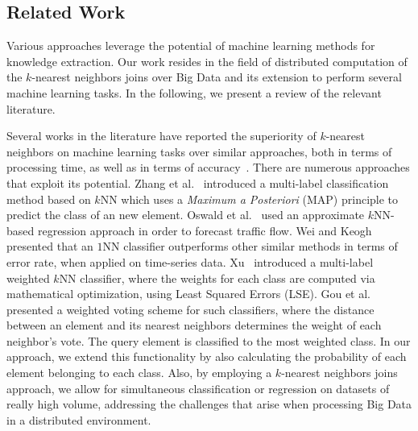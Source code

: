 \subsection{Related Work}
\label{sec:sec_relapp}
Various approaches leverage the potential of machine learning methods for knowledge extraction. Our work resides in the field of distributed computation of the $k$-nearest neighbors joins over Big Data and its extension to perform several machine learning tasks. In the following, we present a review of the relevant literature.

Several works in the literature have reported the superiority of $k$-nearest neighbors on machine learning tasks over similar approaches, both in terms of processing time, as well as in terms of accuracy~\cite{amancio2014systematic, yang1999evaluation, colas2009data}. There are numerous approaches that exploit its potential. Zhang et al.~\cite{linkg2005multi} introduced a multi-label classification method based on $k$NN which uses a \textit{Maximum a Posteriori} (MAP) principle to predict the class of an new element. Oswald et al.~\cite{oswald2001traffic} used an approximate $k$NN-based regression approach in order to forecast traffic flow. Wei and Keogh~\cite{wei2006semi} presented that an $1$NN classifier outperforms other similar methods in terms of error rate, when applied on time-series data. Xu~\cite{Xu2011mwk} introduced a multi-label weighted $k$NN classifier, where the weights for each class are computed via mathematical optimization, using Least Squared Errors (LSE). Gou et al.~\cite{Gou2011jcp} presented a weighted voting scheme for such classifiers, where the distance between an element and its nearest neighbors determines the weight of each neighbor's vote. The query element is classified to the most weighted class. In our approach, we extend this functionality by also calculating the probability of each element belonging to each class. Also, by employing a $k$-nearest neighbors joins approach, we allow for simultaneous classification or regression on datasets of really high volume, addressing the challenges that arise when processing Big Data in a distributed environment.

